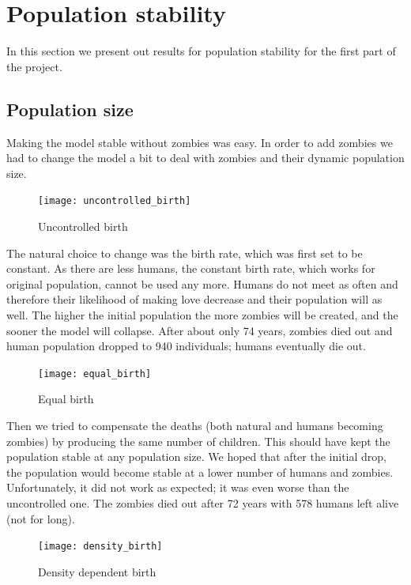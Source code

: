 \documentclass[a4paper]{article}
\begin{document}
\section{Population stability}

In this section we present out results for population stability for the first part of the project.

\subsection{Population size}

Making the model stable without zombies was easy.
In order to add zombies we had to change the model a bit to deal with zombies and their dynamic population size.

\begin{figure}[pht]
    \centering
    \texttt{[image: uncontrolled\_birth]}
    \caption{Uncontrolled birth}
\end{figure}

The natural choice to change was the birth rate, which was first set to be constant.
As there are less humans, the constant birth rate, which works for original population, cannot be used any more.
Humans do not meet as often and therefore their likelihood of making love decrease and their population will as well.
The higher the initial population the more zombies will be created, and the sooner the model will collapse.
After about only 74 years, zombies died out and human population dropped to 940 individuals; humans eventually die out.

\begin{figure}[pht]
    \centering
    \texttt{[image: equal\_birth]}
    \caption{Equal birth}
\end{figure}

Then we tried to compensate the deaths (both natural and humans becoming zombies) by producing the same number of children.
This should have kept the population stable at any population size.
We hoped that after the initial drop, the population would become stable at a lower number of humans and zombies.
Unfortunately, it did not work as expected; it was even worse than the uncontrolled one.
The zombies died out after 72 years with 578 humans left alive (not for long).

\begin{figure}[pht]
    \centering
    \texttt{[image: density\_birth]}
    \caption{Density dependent birth}
\end{figure}
\end{document}
